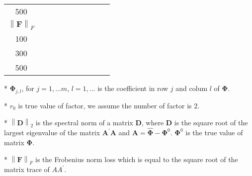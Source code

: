 \documentclass[12pt,a4paper,hyperref]{article}
\begin{document}
\begin{table}[H]
\begin{threeparttable}
\begin{tabular} {*{10}{c}}
500& &  &   &	  &	& & & &	  \\
\cmidrule(lr){1-10}
$\left\| \boldsymbol{F} \right\|_{F} $\\
\cmidrule(lr){1-4}   \cmidrule(lr){5-7}   \cmidrule(lr){8-10}
100&  & & &	  &	& & & &   \\
300&   &  & &	  &	&	& & &  \\
500& &  &   &	  &	& & & &	  \\
\bottomrule
\end{tabular}
\begin{tablenotes}
\footnotesize
  \item[*] $\boldsymbol{\Phi}_{j,l}$, for $j=1,\ldots m$, $l=1,\ldots$ is the coefficient in row $j$ and colum $l$ of $\boldsymbol{\Phi}$.
\item[*] $r_{0}$ is true value of factor, we assume the number of factor is $2$.
 \item[*] $\left\| \boldsymbol{D} \right\|_{2}$ is the spectral norm of a matrix $\boldsymbol{D}$, where $\boldsymbol{D}$ is the square root of the largest eigenvalue of the matrix $\boldsymbol{A}^{'}\boldsymbol{A}$ and $\boldsymbol{A}=\hat{\boldsymbol{\Phi}}- \boldsymbol{\Phi}^{0}$. $\boldsymbol{\Phi}^{0}$ is the true value of matrix $\boldsymbol{\Phi}$.
 \item[*] $\left\| \boldsymbol{F} \right\|_{F} $ is the Frobenius norm loss which is equal to the square root of the matrix trace of $AA^{'}$.
    \end{tablenotes}
\end{threeparttable}
\end{table}
\end{document}
